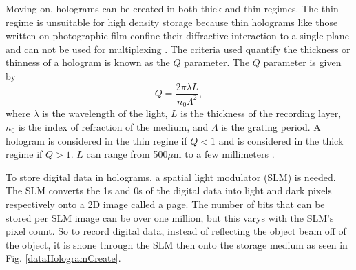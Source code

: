 \documentclass[ notitlepage, numerical, 11pt]{revtex4-1} %
\begin{document}
Moving on, holograms can be created in both thick and thin regimes. The thin regime is unsuitable for high density storage because thin holograms like those written on photographic film confine their diffractive interaction to a single plane and can not be used for multiplexing \cite{HDS}. The criteria used quantify the thickness or thinness of a hologram is known as the $Q$ parameter. The $Q$ parameter is given by 
\begin{equation}
Q = \frac{2\pi\lambda L}{n_0\Lambda^2},
\label{qParameter}
\end{equation}
where $\lambda$ is the wavelength of the light, $L$ is the thickness of the recording layer, $n_0$ is the index of refraction of the medium, and $\Lambda$ is the grating period. A hologram is considered in the thin regine if $Q<1$ and is considered in the thick regime if $Q>1$. $L$ can range from 500$\mu$m to a few millimeters \cite{HDS}.

To store digital data in holograms, a spatial light modulator (SLM) is needed. The SLM converts the 1s and 0s of the digital data into light and dark pixels respectively onto a 2D image called a page. The number of bits that can be stored per SLM image can be over one million, but this varys with the SLM's pixel count. So to record digital data, instead of reflecting the object beam off of the object, it is shone through the SLM then onto the storage medium as seen in Fig. \ref{dataHologramCreate}. 
\end{document}
